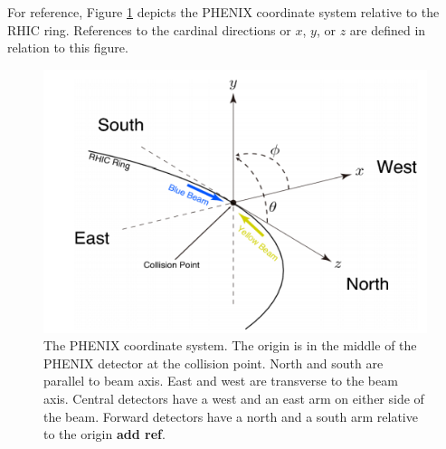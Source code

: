 For reference, Figure \ref{fig:ch3_coord_sys} depicts the PHENIX coordinate system relative to the RHIC ring. References to the cardinal directions or $x$, $y$, or $z$ are defined in relation to this figure.
\begin{figure}[!h]
\begin{center}
\includegraphics[width=0.55\linewidth]{figs/phenix_coord.png}
\caption{The PHENIX coordinate system. The origin is in the middle of the PHENIX detector at the collision point. North and south are parallel to beam axis. East and west are transverse to the beam axis. Central detectors have a west and an east arm on either side of the beam. Forward detectors have a north and a south arm relative to the origin \textbf{add ref}.}
\label{fig:ch3_coord_sys}
\end{center}
\end{figure}

